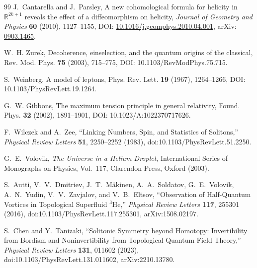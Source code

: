 \documentclass[11pt]{article}
\theoremstyle{definition}
\theoremstyle{plain}
\theoremstyle{remark}
\begin{document}
\begin{thebibliography}{99}
            J.~Cantarella and J.~Parsley,
            \newblock A new cohomological formula for helicity in $\mathbb R^{2k+1}$ reveals the effect of a diffeomorphism on helicity,
            \newblock \emph{Journal of Geometry and Physics} \textbf{60} (2010), 1127--1155,
            \newblock DOI: \href{https://doi.org/10.1016/j.geomphys.2010.04.001}{10.1016/j.geomphys.2010.04.001},
            \newblock arXiv: \href{https://arxiv.org/abs/0903.1465}{0903.1465}.

            W.~H. Zurek,
            \newblock Decoherence, einselection, and the quantum origins of the classical,
            \newblock Rev. Mod. Phys. \textbf{75} (2003), 715--775,
            \newblock DOI: 10.1103/RevModPhys.75.715.

            S.~Weinberg,
            \newblock A model of leptons,
            \newblock Phys. Rev. Lett. \textbf{19} (1967), 1264--1266,
            \newblock DOI: 10.1103/PhysRevLett.19.1264.

            G.~W. Gibbons,
            \newblock The maximum tension principle in general relativity,
            \newblock Found. Phys. \textbf{32} (2002), 1891--1901,
            \newblock DOI: 10.1023/A:1022370717626.

            F.~Wilczek and A.~Zee,
            \newblock ``Linking Numbers, Spin, and Statistics of Solitons,''
            \newblock \textit{Physical Review Letters} \textbf{51}, 2250--2252 (1983),
            \newblock doi:10.1103/PhysRevLett.51.2250.

            G.~E.~Volovik,
            \newblock \textit{The Universe in a Helium Droplet},
            \newblock International Series of Monographs on Physics, Vol.~117,
            \newblock Clarendon Press, Oxford (2003).

            S.~Autti, V.~V.~Dmitriev, J.~T.~M\"akinen, A.~A.~Soldatov,
            G.~E.~Volovik, A.~N.~Yudin, V.~V.~Zavjalov, and V.~B.~Eltsov,
            \newblock ``Observation of Half-Quantum Vortices in Topological Superfluid $^3$He,''
            \newblock \textit{Physical Review Letters} \textbf{117}, 255301 (2016),
            \newblock doi:10.1103/PhysRevLett.117.255301,
            \newblock arXiv:1508.02197.

            S.~Chen and Y.~Tanizaki,
            \newblock ``Solitonic Symmetry beyond Homotopy:
            Invertibility from Bordism and Noninvertibility from Topological Quantum Field Theory,''
            \newblock \textit{Physical Review Letters} \textbf{131}, 011602 (2023),
            \newblock doi:10.1103/PhysRevLett.131.011602,
            \newblock arXiv:2210.13780.


\end{thebibliography}
\end{document}
